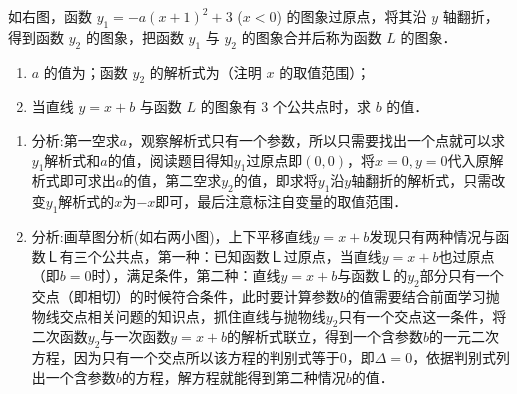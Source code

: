     \noindent
    \begin{example}
        
        如右图，函数 \( y_1 = -a(x+1)^2 + 3 \) (\( x < 0 \)) 的图象过原点，将其沿 \( y \) 轴翻折，得到函数 \( y_2 \) 的图象，把函数 \( y_1 \) 与 \( y_2 \) 的图象合并后称为函数 \( L \) 的图象．
        
        \begin{enumerate}
            \item \( a \) 的值为\underline{\hspace{3.5em}}；函数 \( y_2 \) 的解析式为\underline{\hspace{3.5em}}（注明 \( x \) 的取值范围）；
            \item 当直线 \( y = x + b \) 与函数 \( L \) 的图象有 3 个公共点时，求 \( b \) 的值．
        \end{enumerate}
        \begin{solution}
        
    \begin{enumerate}
    \item 分析:第一空求\(a\)，观察解析式只有一个参数，所以只需要找出一个点就可以求\(y_1\)解析式和\(a\)的值，阅读题目得知\(y_1\)过原点即\((0,0)\)，将\(x=0,y=0\)代入原解析式即可求出\(a\)的值，第二空求\(y_2\)的值，即求将\(y_1\)沿\(y\)轴翻折的解析式，只需改变\(y_1\)解析式的\(x\)为\(-x\)即可，最后注意标注自变量的取值范围．
    \item 分析:画草图分析(如右两小图)，上下平移直线\(y=x+b\)发现只有两种情况与函数Ｌ有三个公共点，第一种：已知函数Ｌ过原点，当直线\(y=x+b\)也过原点（即\(b=0\)时），满足条件，第二种：直线\(y=x+b\)与函数Ｌ的\(y_2\)部分只有一个交点（即相切）的时候符合条件，此时要计算参数\(b\)的值需要结合前面学习抛物线交点相关问题的知识点，抓住直线与抛物线\(y_2\)只有一个交点这一条件，将二次函数\(y_2\)与一次函数\(y=x+b\)的解析式联立，得到一个含参数\(b\)的一元二次方程，因为只有一个交点所以该方程的判别式等于0，即\(\Delta=0\)，依据判别式列出一个含参数\(b\)的方程，解方程就能得到第二种情况\(b\)的值．
    \end{enumerate}
    \end{solution}
    \end{example}
